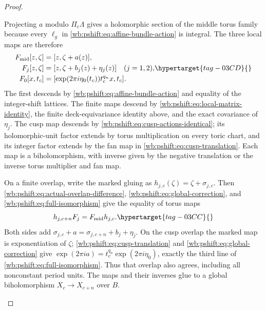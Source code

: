 \begin{proof}
\begin{enumerate}[label=\arabic*.,leftmargin=*]
Projecting $a$ modulo $\Pi_c\Lambda$ gives a holomorphic section of
the middle torus family because every $\ell_g$ in \eqref{wb:pshift:eq:affine-bundle-action} is integral.
The three local maps are therefore
\begin{equation}
\begin{aligned}
 F_{\mathrm{mid}}[z,\zeta]&=[z,\zeta+a(z)],\\
 F_j[z,\zeta]&=[z,\zeta+b_j(z)+\eta_j(z)]\quad(j=1,2),\\
 F_0[x,t_c]&=[\exp(2\pi i\eta_0(t_c))t_c^{q_n}x,t_c].
\end{aligned}
\hypertarget{tag-03CD}{}\label{wb:pshift:eq:full-isomorphism}
\end{equation}
The first descends by \eqref{wb:pshift:eq:affine-bundle-action} and equality of the integer-shift
lattices. The finite maps descend by
\eqref{wb:pshift:eq:local-matrix-identity}, the finite
deck-equivariance identity above, and the exact covariance of $\eta_j$. The cusp map descends by \eqref{wb:pshift:eq:cusp-actions-identical}; its
holomorphic-unit factor extends by torus multiplication on every
toric chart, and its integer factor extends by the fan map in
\eqref{wb:pshift:eq:cusp-translation}. Each map is a biholomorphism, with inverse given by the
negative translation or the inverse torus multiplier and fan map.

On a finite overlap, write the marked gluing as
$h_{j,c}(\zeta)=\zeta+\sigma_{j,c}$. Then \eqref{wb:pshift:eq:actual-overlap-difference}, \eqref{wb:pshift:eq:global-correction}, and
\eqref{wb:pshift:eq:full-isomorphism} give the equality of torus maps
\begin{equation}
                     h_{j,c+n}F_j=F_{\mathrm{mid}}h_{j,c}.
 \hypertarget{tag-03CC}{}\label{wb:pshift:eq:finite-overlap-identity}
\end{equation}
Both sides add
$\sigma_{j,c}+a=\sigma_{j,c+n}+b_j+\eta_j$.
On the cusp overlap the marked map is exponentiation of $\zeta$;
\eqref{wb:pshift:eq:cusp-translation} and \eqref{wb:pshift:eq:global-correction} give
$\exp(2\pi ia)=t_c^{q_n}\exp(2\pi i\eta_0)$, exactly the
third line of \eqref{wb:pshift:eq:full-isomorphism}. Thus that overlap also agrees, including
all nonconstant period units. The maps and their inverses glue to
a global biholomorphism $X_c\to X_{c+n}$ over $B$.


\end{enumerate}
\end{proof}
